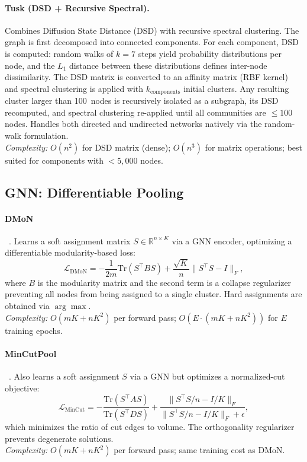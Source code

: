 \documentclass[11pt]{article}
\begin{document}
\paragraph{Tusk (DSD + Recursive Spectral).}
Combines Diffusion State Distance (DSD) with recursive spectral clustering. The graph is first decomposed into connected components. For each component, DSD is computed: random walks of $k{=}7$ steps yield probability distributions per node, and the $L_1$ distance between these distributions defines inter-node dissimilarity. The DSD matrix is converted to an affinity matrix (RBF kernel) and spectral clustering is applied with $k_\text{components}$ initial clusters. Any resulting cluster larger than 100~nodes is recursively isolated as a subgraph, its DSD recomputed, and spectral clustering re-applied until all communities are $\leq 100$ nodes. Handles both directed and undirected networks natively via the random-walk formulation.\\
\emph{Complexity:} $O(n^2)$ for DSD matrix (dense); $O(n^3)$ for matrix operations; best suited for components with $<5{,}000$ nodes.

\subsection{GNN: Differentiable Pooling}

\paragraph{DMoN}~\citep{tsitsulin_dmon_2023}.
Learns a soft assignment matrix $S \in \mathbb{R}^{n \times K}$ via a GNN encoder, optimizing a differentiable modularity-based loss:
\[
\mathcal{L}_\text{DMoN} = -\frac{1}{2m}\text{Tr}(S^\top B S) + \frac{\sqrt{K}}{n}\|S^\top S - I\|_F,
\]
where $B$ is the modularity matrix and the second term is a collapse regularizer preventing all nodes from being assigned to a single cluster. Hard assignments are obtained via $\arg\max$.\\
\emph{Complexity:} $O(m K + n K^2)$ per forward pass; $O(E \cdot(mK + nK^2))$ for $E$ training epochs.

\paragraph{MinCutPool}~\citep{bianchi_mincut_2020}.
Also learns a soft assignment $S$ via a GNN but optimizes a normalized-cut objective:
\[
\mathcal{L}_\text{MinCut} = -\frac{\text{Tr}(S^\top A S)}{\text{Tr}(S^\top D S)} + \frac{\|S^\top S / n - I/K\|_F}{\|S^\top S / n - I/K\|_F + \epsilon},
\]
which minimizes the ratio of cut edges to volume. The orthogonality regularizer prevents degenerate solutions.\\
\emph{Complexity:} $O(mK + nK^2)$ per forward pass; same training cost as DMoN.
\end{document}
